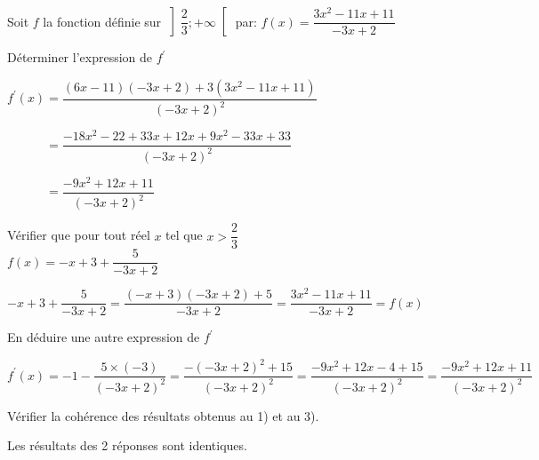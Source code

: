 \documentclass[12pt,a4paper]{article}  %
\begin{document}
Soit $f$ la fonction définie sur $\left] \dfrac{2}{3} ;+\infty\right[$ par: $f(x)=\dfrac{3 x^{2}-11 x+11}{-3 x+2}$
\begin{enumMet}
	\item Déterminer l'expression de $f^{\prime}$\quad {}\\
	\begin{corrBox}
		$f^{\prime}(x)=\dfrac{(6 x-11)(-3 x+2)+3\left(3 x^{2}-11 x+11\right)}{(-3 x+2)^{2}}$
		
		$\phantom{f^{\prime}(x)}=\dfrac{-18 x^{2}-22+33 x+12 x+9 x^{2}-33 x+33}{(-3 x+2)^{2}}$
		
		$\phantom{f^{\prime}(x)}=\dfrac{-9 x^{2}+12 x+11}{(-3 x+2)^{2}}$
	\end{corrBox}
	\item Vérifier que pour tout réel $x$ tel que $x>\dfrac{2}{3}$\\ $f(x)=-x+3+\dfrac{5}{-3 x+2}$\quad {}\\
	\begin{corrBox}
		$-x+3+\dfrac{5}{-3 x+2}=\dfrac{(-x+3)(-3 x+2)+5}{-3 x+2}=\dfrac{3 x^{2}-11 x+11}{-3 x+2}=f(x)$
	\end{corrBox}
	\item En déduire une autre expression de $f^{\prime}$\quad {}\\
	\begin{corrBox}
		$f^{\prime}(x)=-1-\dfrac{5 \times(-3)}{(-3 x+2)^{2}}=\dfrac{-(-3 x+2)^{2}+15}{(-3 x+2)^{2}}=\dfrac{-9 x^{2}+12 x-4+15}{(-3 x+2)^{2}}=\dfrac{-9 x^{2}+12 x+11}{(-3 x+2)^{2}}$
	\end{corrBox}
	\item Vérifier la cohérence des résultats obtenus au 1) et au 3).\quad {}\\
	\begin{corrBox}
		Les résultats des 2 réponses sont identiques.
	\end{corrBox}
\end{enumMet}
\end{document}
